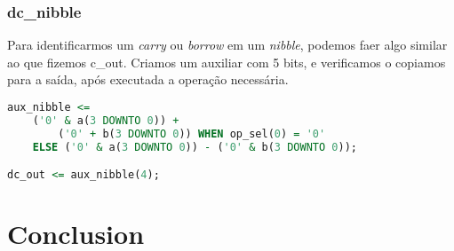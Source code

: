 \documentclass{article}
\begin{document}
\subsubsection{dc\_nibble}

Para identificarmos um \textit{carry} ou \textit{borrow} em um \textit{nibble}, podemos faer algo similar ao que fizemos c\_out. Criamos um auxiliar com 5 bits, e verificamos o copiamos para a saída, após executada a operação necessária.

\begin{lstlisting}[language=VHDL]
aux_nibble <=
    ('0' & a(3 DOWNTO 0)) +
        ('0' + b(3 DOWNTO 0)) WHEN op_sel(0) = '0' 
	ELSE ('0' & a(3 DOWNTO 0)) - ('0' & b(3 DOWNTO 0));

dc_out <= aux_nibble(4);
\end{lstlisting}

\section{Conclusion}
\lipsum[4]
\end{document}
